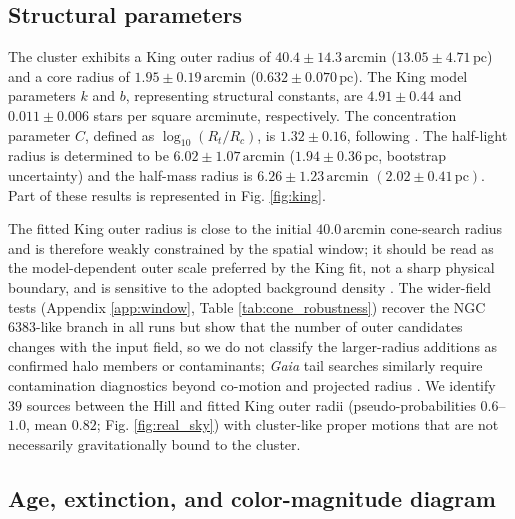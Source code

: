 \documentclass{aa}
\begin{document}
\subsection{Structural parameters}

The cluster exhibits a King outer radius of $40.4 \pm 14.3\,\mathrm{arcmin}$ ($13.05 \pm 4.71\,\mathrm{pc}$) and a core radius of $1.95 \pm 0.19\,\mathrm{arcmin}$ ($0.632 \pm 0.070\,\mathrm{pc}$). The King model parameters $k$ and $b$, representing structural constants, are $4.91 \pm 0.44$ and $0.011 \pm 0.006$ stars per square arcminute, respectively. The concentration parameter $C$, defined as $\log_{10}(R_t/R_c)$, is $1.32 \pm 0.16$, following \citet{1975AJ.....80..427P}. The half-light radius is determined to be $6.02 \pm 1.07\,\mathrm{arcmin}$ ($1.94 \pm 0.36\,\mathrm{pc}$, bootstrap uncertainty) and the half-mass radius is $6.26 \pm 1.23\,\mathrm{arcmin}$ $(2.02 \pm 0.41\,\mathrm{pc})$. Part of these results is represented in Fig. \ref{fig:king}.

The fitted King outer radius is close to the initial $40.0\,\mathrm{arcmin}$ cone-search radius and is therefore weakly constrained by the spatial window; it should be read as the model-dependent outer scale preferred by the King fit, not a sharp physical boundary, and is sensitive to the adopted background density \citep{2025MNRAS.539.2513A}. The wider-field tests (Appendix \ref{app:window}, Table \ref{tab:cone_robustness}) recover the NGC 6383-like branch in all runs but show that the number of outer candidates changes with the input field, so we do not classify the larger-radius additions as confirmed halo members or contaminants; \textit{Gaia} tail searches similarly require contamination diagnostics beyond co-motion and projected radius \citep{2025A&A...694A.258R,2025A&A...698A.156X}. We identify $39$ sources between the Hill and fitted King outer radii (pseudo-probabilities $0.6$--$1.0$, mean $0.82$; Fig. \ref{fig:real_sky}) with cluster-like proper motions that are not necessarily gravitationally bound to the cluster.

\subsection{Age, extinction, and color-magnitude diagram}
\end{document}
